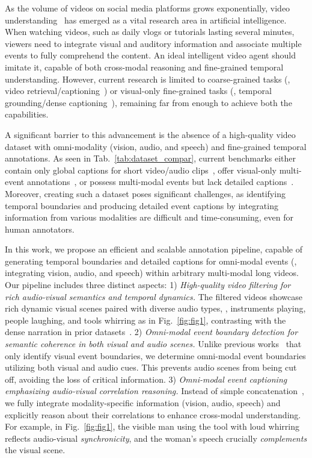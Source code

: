 As the volume of videos on social media platforms grows exponentially, video understanding~\cite{krishna2017dense,gao2017tall,wang2023internvid,zhang2023video} has emerged as a vital research area in artificial intelligence.
When watching videos, such as daily vlogs or tutorials lasting several minutes, viewers need to integrate visual and auditory information and associate multiple events to fully comprehend the content. 
An ideal intelligent video agent should imitate it, capable of both cross-modal reasoning and fine-grained temporal understanding. 
However, current research is limited to coarse-grained tasks (\eg, video retrieval/captioning~\cite{wang2023internvid,liu2024valor}) or visual-only fine-grained tasks (\eg, temporal grounding/dense captioning~\cite{krishna2017dense, gao2017tall}), remaining far from enough to achieve both the capabilities.

A significant barrier to this advancement is the absence of a high-quality video dataset with omni-modality (vision, audio, and speech) and fine-grained temporal annotations. 
As seen in Tab.~\ref{tab:dataset_compar}, current benchmarks either contain only global captions for short video/audio clips~\cite{wang2023internvid, chen2024panda, kim2019audiocaps,mei2024wavcaps,liu2024valor,chen2023vast}, offer visual-only multi-event annotations~\cite{krishna2017dense,gao2017tall}, or possess multi-modal events but lack detailed captions~\cite{tian2018audio,geng2023dense}.
Moreover, creating such a dataset
poses significant challenges, as identifying temporal boundaries and producing detailed event captions by integrating information from various modalities are difficult and time-consuming, even for human annotators.  

In this work, we propose an efficient and scalable annotation pipeline, capable of generating temporal boundaries and detailed captions for omni-modal events (\ie, integrating vision, audio, and speech) within arbitrary multi-modal long videos.
Our pipeline includes three distinct aspects: 
1) \textit{High-quality video filtering for rich audio-visual semantics and temporal dynamics.}
The filtered videos showcase rich dynamic visual scenes paired with diverse audio types, \eg, instruments playing, people laughing, and tools whirring as in Fig.~\ref{fig:fig1}, contrasting with the dense narration in prior datasets~\cite{chen2024panda, chen2023vast}. 
2) \textit{Omni-modal event boundary detection for semantic coherence in both visual and audio scenes.} Unlike previous works~\cite{krishna2017dense,gao2017tall} that only identify visual event boundaries, we determine omni-modal event boundaries utilizing both visual and audio cues. This prevents audio scenes from being cut off, avoiding the loss of critical information.
3) \textit{Omni-modal event captioning emphasizing audio-visual correlation reasoning.} Instead of simple concatenation~\cite{chen2023vast,liu2024valor}, we fully integrate modality-specific information (vision, audio, speech) and explicitly reason about their correlations to enhance cross-modal understanding.
For example, in Fig.~\ref{fig:fig1}, the visible man using the tool with loud whirring reflects audio-visual \textit{synchronicity}, and the woman's speech crucially \textit{complements} the visual scene. 

